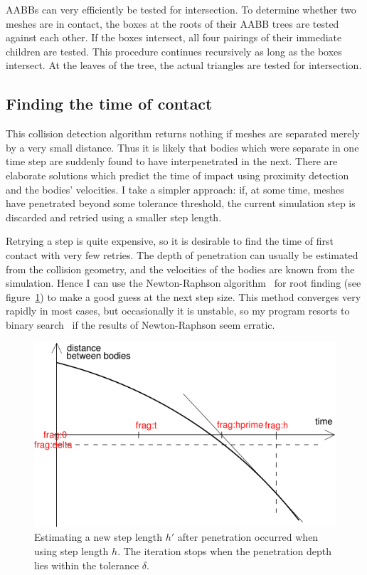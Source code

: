 AABBs can very efficiently be tested for intersection. To determine whether two meshes are in
contact, the boxes at the roots of their AABB trees are tested against each other. If the boxes
intersect, all four pairings of their immediate children are tested. This procedure continues
recursively as long as the boxes intersect. At the leaves of the tree, the actual triangles are
tested for intersection.

\subsection{Finding the time of contact\label{findingContactTime}}

This collision detection algorithm returns nothing if meshes are separated merely by a very small
distance. Thus it is likely that bodies which were separate in one time step are suddenly found
to have interpenetrated in the next. There are elaborate solutions which predict the time of
impact using proximity detection and the bodies' velocities. I take a simpler approach: if, at
some time, meshes have penetrated beyond some tolerance threshold, the current simulation step
is discarded and retried using a smaller step length.

Retrying a step is quite expensive, so it is desirable to find the time of first contact with very
few retries. The depth of penetration can usually be estimated from the collision geometry, and
the velocities of the bodies are known from the simulation. Hence I can use the Newton-Raphson
algorithm~\cite{NRinC} for root finding (see figure~\ref{collisionTime}) to make a good guess at
the next step size. This method converges very rapidly in most cases, but occasionally it is
unstable, so my program resorts to binary search~\cite{Sedgewick:83} if the results of
Newton-Raphson seem erratic.

\begin{figure}
\centerline{\includegraphics{figures/coll-time}}
\caption{Estimating a new step length $h'$ after penetration occurred when using step length $h$.
    The iteration stops when the penetration depth lies within the tolerance $\delta$.
    \label{collisionTime}}
\end{figure}


